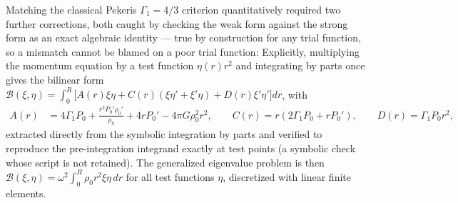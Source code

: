 \documentclass[11pt]{article}
\begin{document}
Matching the classical Pekeris $\Gamma_1=4/3$ criterion \citep{Pekeris1938} quantitatively required two further corrections, both caught by checking the weak form against the strong form as an exact algebraic identity --- true by construction for any trial function, so a mismatch cannot be blamed on a poor trial function:
Explicitly, multiplying the momentum equation by a test function $\eta(r)r^2$ and integrating by parts once gives the bilinear form $\mathcal{B}(\xi,\eta)=\int_0^R\big[A(r)\xi\eta+C(r)(\xi\eta'+\xi'\eta)+D(r)\xi'\eta'\big]dr$, with
\begin{align}
A(r)&=4\Gamma_1P_0+\frac{r^2P_0'\rho_0'}{\rho_0}+4rP_0'-4\pi G\rho_0^2r^2,\qquad
C(r)=r(2\Gamma_1P_0+rP_0'),\qquad
D(r)=\Gamma_1P_0r^2,
\label{eq:ACD}
\end{align}
extracted directly from the symbolic integration by parts and verified to reproduce the pre-integration integrand exactly at test points (a symbolic check whose script is not retained). The generalized eigenvalue problem is then $\mathcal{B}(\xi,\eta)=\omega^2\int_0^R\rho_0r^2\xi\eta\,dr$ for all test functions $\eta$, discretized with linear finite elements.
\end{document}
